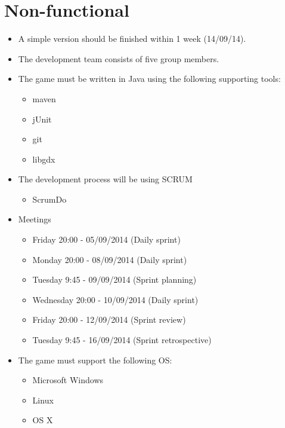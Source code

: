 \documentclass[a4paper,11pt]{article}
\begin{document}
\section*{Non-functional}
\begin{itemize}
  \item A simple version should be finished within 1 week (14/09/14).
  \item The development team consists of five group members.
  \item The game must be written in Java using the following supporting tools:
  \begin{itemize}
    \item maven
    \item jUnit
    \item git
    \item libgdx
  \end{itemize}

  \item The development process will be using SCRUM
  \begin{itemize}
    \item ScrumDo
  \end{itemize}

  \item Meetings
  \begin{itemize}
    \item Friday 20:00 - 05/09/2014 (Daily sprint)
    \item Monday 20:00 - 08/09/2014 (Daily sprint)
    \item Tuesday 9:45 - 09/09/2014 (Sprint planning)
    \item Wednesday 20:00 - 10/09/2014 (Daily sprint)
    \item Friday 20:00 - 12/09/2014 (Sprint review)
    \item Tuesday 9:45 - 16/09/2014 (Sprint retrospective)
  \end{itemize}

  \item The game must support the following OS:
  \begin{itemize}
    \item Microsoft Windows
    \item Linux
    \item OS X
  \end{itemize}
\end{itemize}
\end{document}
